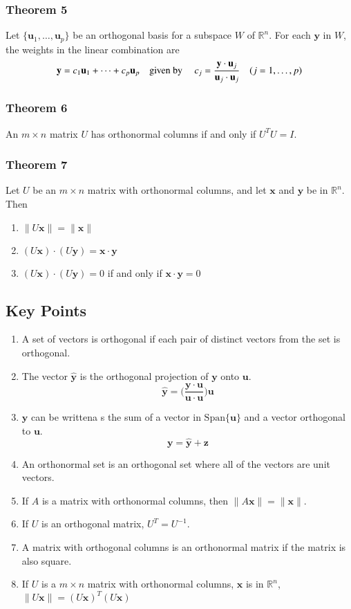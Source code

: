 \documentclass{article}
\begin{document}
\subsubsection*{Theorem 5}
Let $\{\mathbf{u}_1, \ldots, \mathbf{u}_p\}$ be an orthogonal basis for a subspace $W$ of
$\mathbb{R}^n$. For each $\mathbf{y}$ in $W$, the weights in the linear combination are
\[\mathbf{y}=c_1\mathbf{u}_1 + \cdots + c_p\mathbf{u}_p\text{\quad given by \quad} c_j=
\frac{\mathbf{y}\cdot\mathbf{u}_j}{\mathbf{u}_j\cdot \mathbf{u}_j}\quad (j=1, \ldots, p)\]

\subsubsection*{Theorem 6}
An $m\times n$ matrix $U$ has orthonormal columns if and only if $U^T U=I$.

\subsubsection*{Theorem 7}
Let $U$ be an $m\times n$ matrix with orthonormal columns, and let $\mathbf{x}$ and $\mathbf{y}$ be
in $\mathbb{R}^n$. Then
\begin{enumerate}
    \item $\|U\mathbf{x}\|=\|\mathbf{x}\|$
    \item $(U\mathbf{x})\cdot(U\mathbf{y})=\mathbf{x}\cdot\mathbf{y}$
    \item $(U\mathbf{x})\cdot(U\mathbf{y})=0$ if and only if $\mathbf{x}\cdot\mathbf{y}=0$
\end{enumerate}

\subsection*{Key Points}
\begin{enumerate}
    \item A set of vectors is orthogonal if each pair of distinct vectors from the set is
    orthogonal.
    \item The vector $\mathbf{\hat{y}}$ is the orthogonal projection of $\mathbf{y}$ onto
    $\mathbf{u}$.
    \[\mathbf{\hat{y}}=\Bigg(\frac{\mathbf{y\cdot u}}{\mathbf{u\cdot u}}\Bigg)\mathbf{u}\]
    \item $\mathbf{y}$ can be writtena s the sum of a vector in $\text{Span}\{\mathbf{u}\}$ and a
    vector orthogonal to $\mathbf{u}$.
    \[\mathbf{y}=\mathbf{\hat{y}}+\mathbf{z}\]
    \item An orthonormal set is an orthogonal set where all of the vectors are unit vectors.
    \item If $A$ is a matrix with orthonormal columns, then $\|A\mathbf{x}\|=\|\mathbf{x}\|$.
    \item If $U$ is an orthogonal matrix, $U^T=U^{-1}$.
    \item A matrix with orthogonal columns is an orthonormal matrix if the matrix is also square.
    \item If $U$ is a $m\times n$ matrix with orthonormal columns, $\mathbf{x}$ is in
    $\mathbb{R}^n$, $\|U\mathbf{x}\|={(U\mathbf{x})}^T(U\mathbf{x})$
\end{enumerate}
\end{document}
